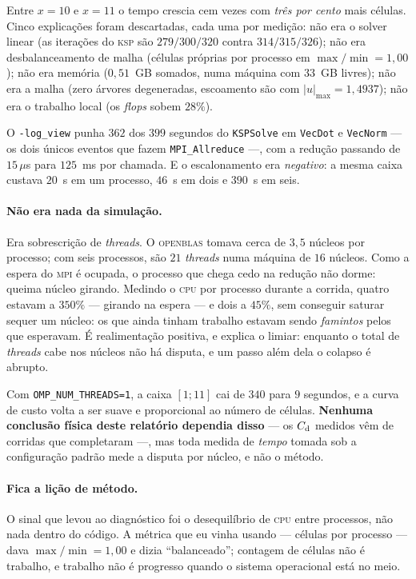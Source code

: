 Entre $x=10$ e $x=11$ o tempo crescia cem vezes com \emph{três por cento} mais
células. Cinco explicações foram descartadas, cada uma por medição: não era o
solver linear (as iterações do \textsc{ksp} são $279/300/320$ contra
$314/315/326$); não era desbalanceamento de malha (células próprias por processo
em $\max/\min = 1{,}00$); não era memória ($0{,}51$~GB somados, numa máquina com
$33$~GB livres); não era a malha (zero árvores degeneradas, escoamento são com
$|u|_{\max} = 1{,}4937$); não era o trabalho local (os \emph{flops} sobem
$28\%$).

O \texttt{-log\_view} punha $362$ dos $399$ segundos do \texttt{KSPSolve} em
\texttt{VecDot} e \texttt{VecNorm} --- os dois únicos eventos que fazem
\texttt{MPI\_Allreduce} ---, com a redução passando de $15\,\mu$s para $125$~ms
por chamada. E o escalonamento era \emph{negativo}: a mesma caixa custava $20$~s
em um processo, $46$~s em dois e $390$~s em seis.

\paragraph{Não era nada da simulação.} Era sobrescrição de \emph{threads}. O
\textsc{openblas} tomava cerca de $3{,}5$ núcleos por processo; com seis
processos, são $21$ \emph{threads} numa máquina de $16$ núcleos. Como a espera do
\textsc{mpi} é ocupada, o processo que chega cedo na redução não dorme: queima
núcleo girando. Medindo o \textsc{cpu} por processo durante a corrida, quatro
estavam a $350\%$ --- girando na espera --- e dois a $45\%$, sem conseguir
saturar sequer um núcleo: os que ainda tinham trabalho estavam sendo
\emph{famintos} pelos que esperavam. É realimentação positiva, e explica o
limiar: enquanto o total de \emph{threads} cabe nos núcleos não há disputa, e um
passo além dela o colapso é abrupto.

Com \texttt{OMP\_NUM\_THREADS=1}, a caixa $[1;11]$ cai de $340$ para $9$
segundos, e a curva de custo volta a ser suave e proporcional ao número de
células. \textbf{Nenhuma conclusão física deste relatório dependia disso} --- os
$C_{\mathrm{d}}$ medidos vêm de corridas que completaram ---, mas toda medida de
\emph{tempo} tomada sob a configuração padrão mede a disputa por núcleo, e não o
método.

\paragraph{Fica a lição de método.} O sinal que levou ao diagnóstico foi o
desequilíbrio de \textsc{cpu} entre processos, não nada dentro do código. A
métrica que eu vinha usando --- células por processo --- dava $\max/\min =
1{,}00$ e dizia ``balanceado''; contagem de células não é trabalho, e trabalho
não é progresso quando o sistema operacional está no meio.


